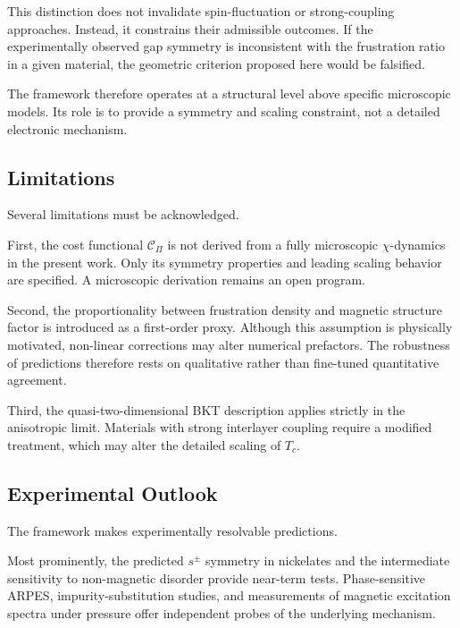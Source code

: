     This distinction does not invalidate
    spin-fluctuation or strong-coupling approaches.
    Instead,
    it constrains their admissible outcomes.
    If the experimentally observed gap symmetry
    is inconsistent with the frustration ratio
    in a given material,
    the geometric criterion proposed here
    would be falsified.

    The framework therefore operates
    at a structural level above specific microscopic models.
    Its role is to provide a symmetry and scaling constraint,
    not a detailed electronic mechanism.

  \subsection{Limitations}
    \label{subsec:limitations}

    Several limitations must be acknowledged.

    First,
    the cost functional $\mathcal{C}_{\Pi}$
    is not derived from a fully microscopic $\chi$-dynamics
    in the present work.
    Only its symmetry properties and leading scaling behavior
    are specified.
    A microscopic derivation remains an open program.

    Second,
    the proportionality between frustration density
    and magnetic structure factor
    is introduced as a first-order proxy.
    Although this assumption is physically motivated,
    non-linear corrections may alter numerical prefactors.
    The robustness of predictions therefore rests
    on qualitative rather than fine-tuned quantitative agreement.

    Third,
    the quasi-two-dimensional BKT description
    applies strictly in the anisotropic limit.
    Materials with strong interlayer coupling
    require a modified treatment,
    which may alter the detailed scaling of $T_c$.

  \subsection{Experimental Outlook}
    \label{subsec:experimental-outlook}

    The framework makes experimentally resolvable predictions.

    Most prominently,
    the predicted $s^\pm$ symmetry in nickelates
    and the intermediate sensitivity to non-magnetic disorder
    provide near-term tests.
    Phase-sensitive ARPES,
    impurity-substitution studies,
    and measurements of magnetic excitation spectra
    under pressure
    offer independent probes of the underlying mechanism.

